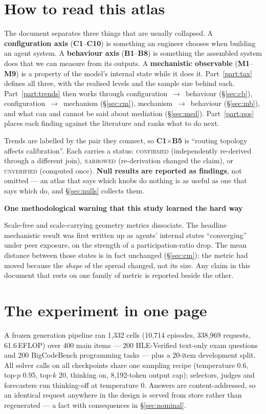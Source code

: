 \documentclass[10pt,a4paper]{article}
\newenvironment{aside}[1]{%
  \par\medskip\noindent
  \begin{lrbox}{\asidebox}%
  \begin{minipage}{\dimexpr\linewidth-2\fboxsep\relax}%
  \small\textbf{\textcolor{accent}{#1}}\par\smallskip\small
}{%
  \end{minipage}%
  \end{lrbox}%
  \noindent\colorbox{panel}{\usebox{\asidebox}}\par\medskip
}
\newcommand{\ax}[1]{\textcolor{accent}{\textbf{#1}}}
\newcommand{\bx}[1]{\textcolor{warm}{\textbf{#1}}}
\newcommand{\mx}[1]{\textbf{#1}}
\begin{document}
\section{How to read this atlas}

The document separates three things that are usually collapsed. A \textbf{configuration axis} (\ax{C1}--\ax{C10}) is something an engineer chooses when building an agent system. A \textbf{behaviour axis} (\bx{B1}--\bx{B8}) is something the assembled system does that we can measure from its outputs. A \textbf{mechanistic observable} (\mx{M1}--\mx{M9}) is a property of the model's internal state while it does it. Part~\ref{part:tax} defines all three, with the realised levels and the sample size behind each. Part~\ref{part:trends} then works through configuration~$\to$~behaviour (\S\ref{sec:cb}), configuration~$\to$~mechanism (\S\ref{sec:cm}), mechanism~$\to$~behaviour (\S\ref{sec:mb}), and what can and cannot be said about mediation (\S\ref{sec:med}). Part~\ref{part:pos} places each finding against the literature and ranks what to do next.

Trends are labelled by the pair they connect, so \ax{C1}$\times$\bx{B5} is ``routing topology affects calibration''. Each carries a status: \textsc{confirmed} (independently re-derived through a different join), \textsc{narrowed} (re-derivation changed the claim), or \textsc{unverified} (computed once). \textbf{Null results are reported as findings}, not omitted --- an atlas that says which knobs do nothing is as useful as one that says which do, and \S\ref{sec:nulls} collects them.

\begin{aside}{One methodological warning that this study learned the hard way}
Scale-free and scale-carrying geometry metrics dissociate. The headline mechanistic result was first written up as agents' internal states ``converging'' under peer exposure, on the strength of a participation-ratio drop. The mean distance between those states is in fact unchanged (\S\ref{sec:cm}); the metric had moved because the \emph{shape} of the spread changed, not its size. Any claim in this document that rests on one family of metric is reported beside the other.
\end{aside}

\section{The experiment in one page}\label{sec:exp}

A frozen generation pipeline ran 1{,}332 cells (10{,}714 episodes, 338{,}969 requests, 61.6\,EFLOP) over 400 main items --- 200 HLE-Verified text-only exam questions and 200 BigCodeBench programming tasks --- plus a 20-item development split. All solver calls on all checkpoints share one sampling recipe (temperature 0.6, top-$p$ 0.95, top-$k$ 20, thinking on, 8{,}192-token output cap); selectors, judges and forecasters run thinking-off at temperature 0. Answers are content-addressed, so an identical request anywhere in the design is served from store rather than regenerated --- a fact with consequences in \S\ref{sec:nominal}.
\end{document}
